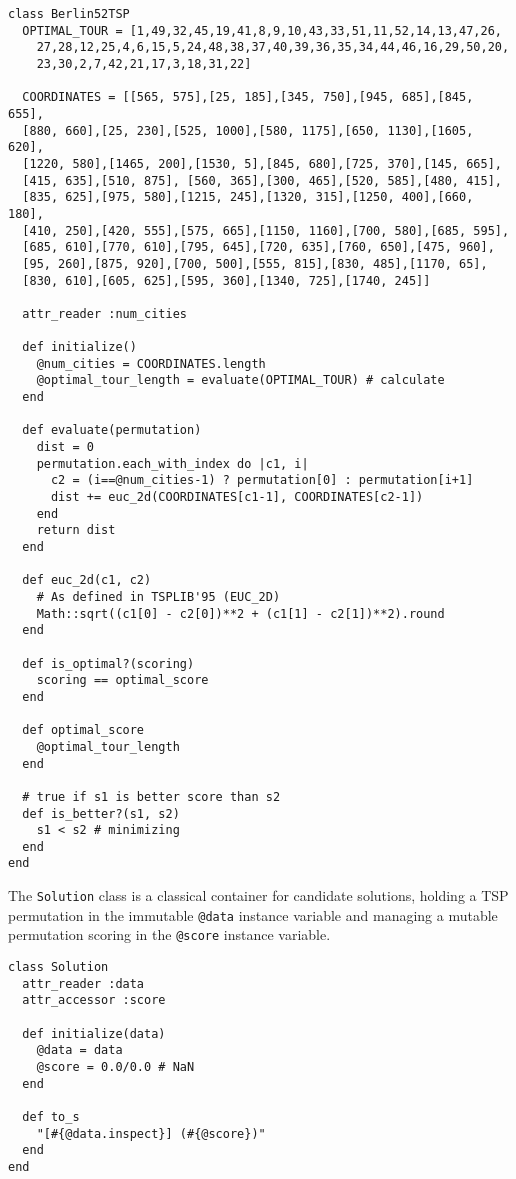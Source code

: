 \begin{lstlisting}
class Berlin52TSP
  OPTIMAL_TOUR = [1,49,32,45,19,41,8,9,10,43,33,51,11,52,14,13,47,26,
    27,28,12,25,4,6,15,5,24,48,38,37,40,39,36,35,34,44,46,16,29,50,20,
    23,30,2,7,42,21,17,3,18,31,22]
        
  COORDINATES = [[565, 575],[25, 185],[345, 750],[945, 685],[845, 655],
  [880, 660],[25, 230],[525, 1000],[580, 1175],[650, 1130],[1605, 620], 
  [1220, 580],[1465, 200],[1530, 5],[845, 680],[725, 370],[145, 665],
  [415, 635],[510, 875], [560, 365],[300, 465],[520, 585],[480, 415],
  [835, 625],[975, 580],[1215, 245],[1320, 315],[1250, 400],[660, 180],
  [410, 250],[420, 555],[575, 665],[1150, 1160],[700, 580],[685, 595],
  [685, 610],[770, 610],[795, 645],[720, 635],[760, 650],[475, 960],
  [95, 260],[875, 920],[700, 500],[555, 815],[830, 485],[1170, 65],
  [830, 610],[605, 625],[595, 360],[1340, 725],[1740, 245]]
  
  attr_reader :num_cities

  def initialize()
    @num_cities = COORDINATES.length        
    @optimal_tour_length = evaluate(OPTIMAL_TOUR) # calculate
  end
  
  def evaluate(permutation)
    dist = 0    
    permutation.each_with_index do |c1, i|
      c2 = (i==@num_cities-1) ? permutation[0] : permutation[i+1] 
      dist += euc_2d(COORDINATES[c1-1], COORDINATES[c2-1])
    end
    return dist
  end
  
  def euc_2d(c1, c2)
    # As defined in TSPLIB'95 (EUC_2D)
    Math::sqrt((c1[0] - c2[0])**2 + (c1[1] - c2[1])**2).round
  end

  def is_optimal?(scoring)
    scoring == optimal_score
  end

  def optimal_score
    @optimal_tour_length
  end
  
  # true if s1 is better score than s2
  def is_better?(s1, s2)
    s1 < s2 # minimizing
  end
end
\end{lstlisting}

The \texttt{Solution} class is a classical container for candidate solutions, holding a TSP permutation in the immutable \texttt{@data} instance variable and managing a mutable permutation scoring in the \texttt{@score} instance variable. 

\begin{lstlisting}
class Solution
  attr_reader :data
  attr_accessor :score
  
  def initialize(data)
    @data = data
    @score = 0.0/0.0 # NaN
  end
  
  def to_s
    "[#{@data.inspect}] (#{@score})"
  end    
end
\end{lstlisting}

